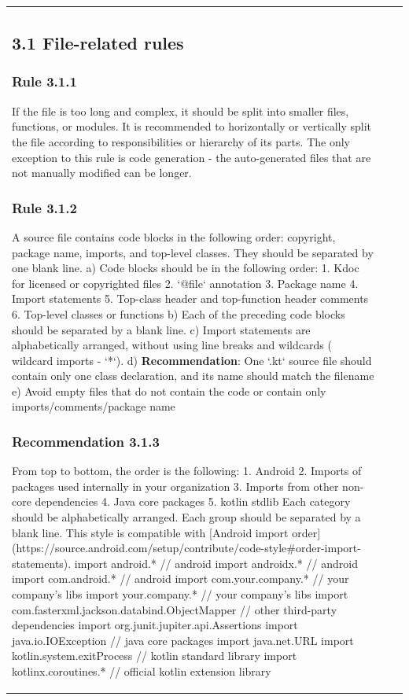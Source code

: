 \begin{center}
\begin{tabular}{ |p{}|p{}|p{}| }
\subsection*{\textbf{3.1 File-related rules}}
\subsubsection*{\textbf{Rule 3.1.1}}
If the file is too long and complex, it should be split into smaller files, functions, or modules.
It is recommended to horizontally or vertically split the file according to responsibilities or hierarchy of its parts.
The only exception to this rule is code generation - the auto-generated files that are not manually modified can be longer.
\subsubsection*{\textbf{Rule 3.1.2}}
A source file contains code blocks in the following order: copyright, package name, imports, and top-level classes. They should be separated by one blank line.
a) Code blocks should be in the following order:
1.	Kdoc for licensed or copyrighted files
2.	`@file` annotation
3.	Package name
4.	Import statements
5.	Top-class header and top-function header comments
6.	Top-level classes or functions
b) Each of the preceding code blocks should be separated by a blank line.
c) Import statements are alphabetically arranged, without using line breaks and wildcards ( wildcard imports - `*`).
d) \textbf{Recommendation}: One `.kt` source file should contain only one class declaration, and its name should match the filename
e) Avoid empty files that do not contain the code or contain only imports/comments/package name
\subsubsection*{\textbf{Recommendation 3.1.3}}
From top to bottom, the order is the following:
1. Android
2. Imports of packages used internally in your organization
3. Imports from other non-core dependencies
4. Java core packages
5. kotlin stdlib
Each category should be alphabetically arranged. Each group should be separated by a blank line. This style is compatible with  [Android import order](https://source.android.com/setup/contribute/code-style\#order-import-statements).
import android.* // android
import androidx.* // android
import com.android.* // android
import com.your.company.* // your company's libs
import your.company.* // your company's libs
import com.fasterxml.jackson.databind.ObjectMapper // other third-party dependencies
import org.junit.jupiter.api.Assertions
import java.io.IOException // java core packages
import java.net.URL
import kotlin.system.exitProcess  // kotlin standard library
import kotlinx.coroutines.*  // official kotlin extension library

\end{tabular}
\end{center}
